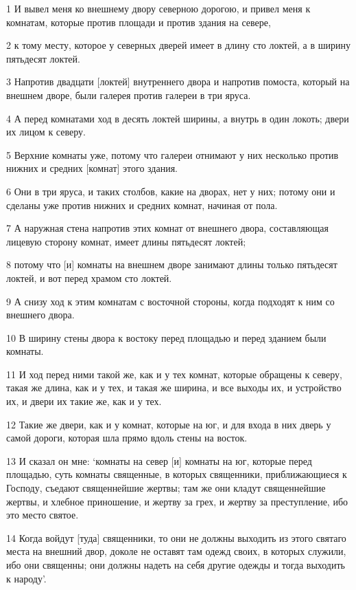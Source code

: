 \par 1 И вывел меня ко внешнему двору северною дорогою, и привел меня к комнатам, которые против площади и против здания на севере,
\par 2 к тому месту, которое у северных дверей имеет в длину сто локтей, а в ширину пятьдесят локтей.
\par 3 Напротив двадцати [локтей] внутреннего двора и напротив помоста, который на внешнем дворе, были галерея против галереи в три яруса.
\par 4 А перед комнатами ход в десять локтей ширины, а внутрь в один локоть; двери их лицом к северу.
\par 5 Верхние комнаты уже, потому что галереи отнимают у них несколько против нижних и средних [комнат] этого здания.
\par 6 Они в три яруса, и таких столбов, какие на дворах, нет у них; потому они и сделаны уже против нижних и средних комнат, начиная от пола.
\par 7 А наружная стена напротив этих комнат от внешнего двора, составляющая лицевую сторону комнат, имеет длины пятьдесят локтей;
\par 8 потому что [и] комнаты на внешнем дворе занимают длины только пятьдесят локтей, и вот перед храмом сто локтей.
\par 9 А снизу ход к этим комнатам с восточной стороны, когда подходят к ним со внешнего двора.
\par 10 В ширину стены двора к востоку перед площадью и перед зданием были комнаты.
\par 11 И ход перед ними такой же, как и у тех комнат, которые обращены к северу, такая же длина, как и у тех, и такая же ширина, и все выходы их, и устройство их, и двери их такие же, как и у тех.
\par 12 Такие же двери, как и у комнат, которые на юг, и для входа в них дверь у самой дороги, которая шла прямо вдоль стены на восток.
\par 13 И сказал он мне: `комнаты на север [и] комнаты на юг, которые перед площадью, суть комнаты священные, в которых священники, приближающиеся к Господу, съедают священнейшие жертвы; там же они кладут священнейшие жертвы, и хлебное приношение, и жертву за грех, и жертву за преступление, ибо это место святое.
\par 14 Когда войдут [туда] священники, то они не должны выходить из этого святаго места на внешний двор, доколе не оставят там одежд своих, в которых служили, ибо они священны; они должны надеть на себя другие одежды и тогда выходить к народу'.
